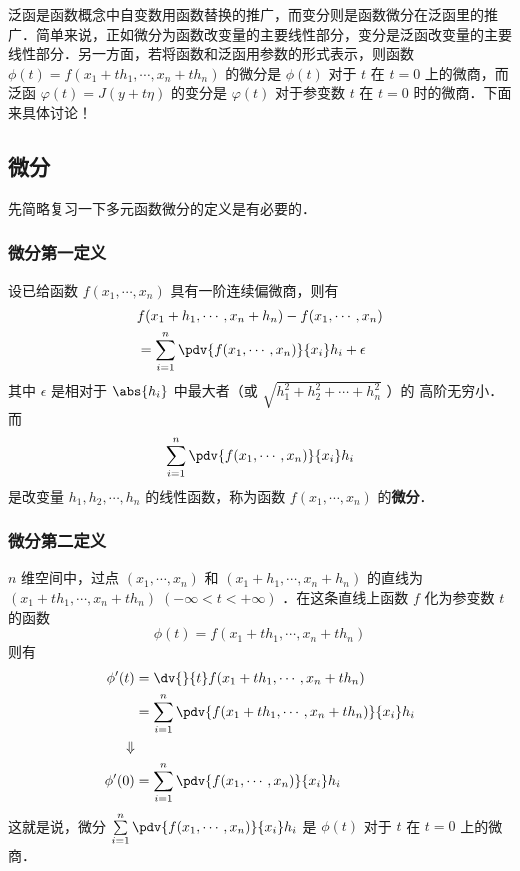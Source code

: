 


泛函是函数概念中自变数用函数替换的推广，而变分则是函数微分在泛函里的推广．简单来说，正如微分为函数改变量的主要线性部分，变分是泛函改变量的主要线性部分．另一方面，若将函数和泛函用参数的形式表示，则函数$\phi(t)=f(x_1+th_1,\cdots,x_n+th_n) $ 的微分是 $\phi(t)$ 对于 $t$ 在 $t=0$ 上的微商，而泛函 $\varphi(t)=J(y+t\eta)$ 的变分是 $\varphi(t)$ 对于参变数 $t$ 在 $t=0$ 时的微商．下面来具体讨论！
\subsection{微分}
先简略复习一下多元函数微分的定义是有必要的．
\subsubsection{微分第一定义}
设已给函数 $f(x_1,\cdots,x_n)$ 具有一阶连续偏微商，则有
\begin{equation}
\begin{aligned}
&f(x_1+h_1,\cdots,x_n+h_n)-f(x_1,\cdots,x_n)\\
&=\sum_{i=1}^{n} \pdv{f(x_1,\cdots,x_n)}{x_i}h_i+\epsilon
\end{aligned}
\end{equation}
其中 $\epsilon$ 是相对于 $\abs{h_i}$ 中最大者（或 $\sqrt{h_1^2+h_2^2+\cdots+h_n^2}$ ）的 高阶无穷小．而 
\begin{equation}
\sum_{i=1}^{n} \pdv{f(x_1,\cdots,x_n)}{x_i}h_i
\end{equation}
是改变量 $h_1,h_2,\cdots,h_n$ 的线性函数，称为函数 $f(x_1,\cdots,x_n)$ 的\textbf{微分}．
\subsubsection{微分第二定义}
$n$ 维空间中，过点 $(x_1,\cdots,x_n)$ 和 $(x_1+h_1,\cdots,x_n+h_n)$ 的直线为 $(x_1+th_1,\cdots,x_n+th_n)\;(-\infty<t<+\infty)$ ．在这条直线上函数 $f$ 化为参变数 $t$ 的函数
\begin{equation}
\phi(t)=f(x_1+th_1,\cdots,x_n+th_n) 
\end{equation}
则有
\begin{equation}
\begin{aligned}
\phi'(t)&=\dv{}{t}f(x_1+th_1,\cdots,x_n+th_n) \\
&=\sum_{i=1}^n\pdv{f(x_1+th_1,\cdots,x_n+th_n)}{x_i}h_i
\\
\Downarrow
\\
\phi'(0)&=\sum_{i=1}^n\pdv{f(x_1,\cdots,x_n)}{x_i}h_i
\end{aligned}
\end{equation}
这就是说，微分 $\sum\limits_{i=1}^n\pdv{f(x_1,\cdots,x_n)}{x_i}h_i$ 是 $\phi(t)$ 对于 $t$ 在 $t=0$ 上的微商．
